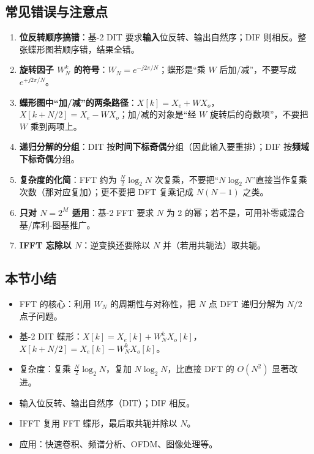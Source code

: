 \subsection{常见错误与注意点}\label{ux5e38ux89c1ux9519ux8befux4e0eux6ce8ux610fux70b9-28}

\begin{enumerate}
\def\labelenumi{\arabic{enumi}.}
\tightlist
\item
  \textbf{位反转顺序搞错}：基-2 DIT
  要求\textbf{输入}位反转、输出自然序；DIF
  则相反。整张蝶形图若顺序错，结果全错。
\item
  \textbf{旋转因子 \(W_N^k\) 的符号}：\(W_N=e^{-j2\pi/N}\)；蝶形是``乘
  \(W\) 后加/减''，不要写成 \(e^{+j2\pi/N}\)。
\item
  \textbf{蝶形图中``加/减''的两条路径}：\(X[k]=X_e+WX_o\)，\(X[k+N/2]=X_e-WX_o\)；加/减的对象是``经
  \(W\) 旋转后的奇数项''，不要把 \(W\) 乘到两项上。
\item
  \textbf{递归分解的分组}：DIT
  按\textbf{时间下标奇偶}分组（因此输入要重排）；DIF
  按\textbf{频域下标奇偶}分组。
\item
  \textbf{复杂度的化简}：FFT 约为 \(\frac{N}{2}\log_2 N\)
  次复乘，不要把``\(N\log_2 N\)''直接当作复乘次数（那对应复加）；更不要把
  DFT 复乘记成 \(N(N-1)\) 之类。
\item
  \textbf{只对 \(N=2^M\) 适用}：基-2 FFT 要求 \(N\) 为 2
  的幂；若不是，可用补零或混合基/库利-图基推广。
\item
  \textbf{IFFT 忘除以 \(N\)}：逆变换还要除以 \(N\)
  并（若用共轭法）取共轭。
\end{enumerate}

\subsection{本节小结}\label{ux672cux8282ux5c0fux7ed3-28}

\begin{itemize}
\tightlist
\item
  FFT 的核心：利用 \(W_N\) 的周期性与对称性，把 \(N\) 点 DFT 递归分解为
  \(N/2\) 点子问题。
\item
  基-2 DIT
  蝶形：\(X[k]=X_e[k]+W_N^k X_o[k]\)，\(X[k+N/2]=X_e[k]-W_N^k X_o[k]\)。
\item
  复杂度：复乘 \(\frac{N}{2}\log_2 N\)，复加 \(N\log_2 N\)，比直接 DFT
  的 \(O(N^2)\) 显著改进。
\item
  输入位反转、输出自然序（DIT）；DIF 相反。
\item
  IFFT 复用 FFT 蝶形，最后取共轭并除以 \(N\)。
\item
  应用：快速卷积、频谱分析、OFDM、图像处理等。
\end{itemize}

\newpage
